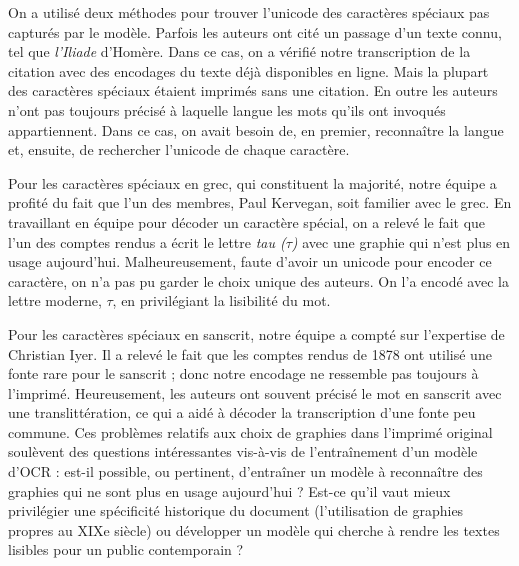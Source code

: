 \documentclass{article}
\begin{document}
	On a utilisé deux méthodes pour trouver l’unicode des caractères spéciaux pas capturés par le modèle. Parfois les auteurs ont cité un passage d’un texte connu, tel que \textit{l’Iliade} d'Homère. Dans ce cas, on a vérifié notre transcription de la citation avec des encodages du texte déjà disponibles en ligne. Mais la plupart des caractères spéciaux étaient imprimés sans une citation. En outre les auteurs n’ont pas toujours précisé à laquelle langue les mots qu’ils ont invoqués appartiennent. Dans ce cas, on avait besoin de, en premier, reconnaître la langue et, ensuite, de rechercher l’unicode de chaque caractère.
	
	Pour les caractères spéciaux en grec, qui constituent la majorité, notre équipe a profité du fait que l'un des membres, Paul Kervegan, soit familier avec le grec. En travaillant en équipe pour décoder un caractère spécial, on a relevé le fait que l’un des comptes rendus a écrit le lettre \textit{tau ($\tau$)} avec une graphie qui n'est plus en usage aujourd'hui. Malheureusement, faute d'avoir un unicode pour encoder ce caractère, on n’a pas pu garder le choix unique des auteurs. On l’a encodé avec la lettre moderne, \textit{$\tau$}, en privilégiant la lisibilité du mot.
	
	Pour les caractères spéciaux en sanscrit, notre équipe a compté sur l’expertise de Christian Iyer. Il a relevé le fait que les comptes rendus de 1878 ont utilisé une fonte rare pour le sanscrit ; donc notre encodage ne ressemble pas toujours à l’imprimé. Heureusement, les auteurs ont souvent précisé le mot en sanscrit avec une translittération, ce qui a aidé à décoder la transcription d’une fonte peu commune. Ces problèmes relatifs aux choix de graphies dans l'imprimé original soulèvent des questions intéressantes vis-à-vis de l'entraînement d'un modèle d'OCR : est-il possible, ou pertinent, d'entraîner un modèle à reconnaître des graphies qui ne sont plus en usage aujourd'hui ? Est-ce qu'il vaut mieux privilégier une spécificité historique du document (l'utilisation de graphies propres au XIXe siècle) ou développer un modèle qui cherche à rendre les textes lisibles pour un public contemporain ?
	
\end{document}
